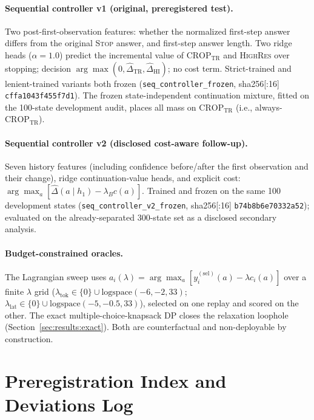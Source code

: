 \documentclass[10pt]{article}
\begin{document}
\paragraph{Sequential controller v1 (original, preregistered test).}
Two post-first-observation features: whether the normalized first-step
answer differs from the original \textsc{Stop} answer, and first-step
answer length. Two ridge heads ($\alpha=1.0$) predict the incremental
value of $\mathrm{CROP}_{\mathrm{TR}}$ and \textsc{HighRes} over stopping;
decision $\arg\max(0, \widehat\Delta_{\mathrm{TR}},
\widehat\Delta_{\mathrm{HI}})$; no cost term. Strict-trained and
lenient-trained variants both frozen
(\texttt{seq\_controller\_frozen}, sha256[:16] \texttt{cffa1043f455f7d1}).
The frozen state-independent continuation mixture, fitted on the 100-state
development audit, places all mass on $\mathrm{CROP}_{\mathrm{TR}}$
(i.e., always-$\mathrm{CROP}_{\mathrm{TR}}$).

\paragraph{Sequential controller v2 (disclosed cost-aware follow-up).}
Seven history features (including confidence before/after the first
observation and their change), ridge continuation-value heads, and explicit
cost: $\arg\max_a [\widehat\Delta(a\mid h_1) - \lambda_B c(a)]$. Trained
and frozen on the same 100 development states
(\texttt{seq\_controller\_v2\_frozen}, sha256[:16]
\texttt{b74b8b6e70332a52}); evaluated on the already-separated 300-state
set as a disclosed secondary analysis.

\paragraph{Budget-constrained oracles.}
The Lagrangian sweep uses
$a_i(\lambda) = \arg\max_a [y_i^{(\mathrm{sel})}(a) - \lambda c_i(a)]$
over a finite $\lambda$ grid ($\lambda_{\text{tok}} \in \{0\} \cup
\mathrm{logspace}(-6,-2,33)$; $\lambda_{\text{lat}} \in \{0\} \cup
\mathrm{logspace}(-5,-0.5,33)$), selected on one replay and scored on the
other. The exact multiple-choice-knapsack DP closes the relaxation
loophole (Section~\ref{sec:results:exact}). Both are counterfactual and
non-deployable by construction.

\section{Preregistration Index and Deviations Log}
\label{sec:prereg}
\end{document}
